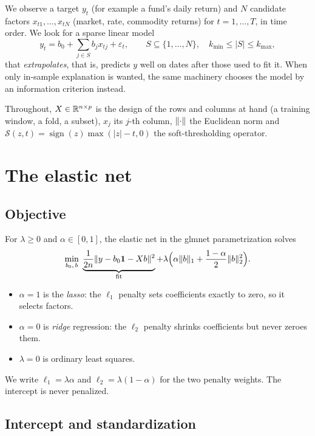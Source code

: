 \documentclass[11pt,a4paper]{article}
\newcommand{\sth}{\mathcal{S}}
\begin{document}
We observe a target $y_t$ (for example a fund's daily return) and $N$ candidate factors
$x_{t1},\dots,x_{tN}$ (market, rate, commodity returns) for $t=1,\dots,T$, in time order.
We look for a sparse linear model
\[
  y_t = b_0 + \sum_{j\in S} b_j x_{tj} + \varepsilon_t,\qquad S\subseteq\{1,\dots,N\},\quad
  k_{\min}\le|S|\le k_{\max},
\]
that \emph{extrapolates}, that is, predicts $y$ well on dates after those used to fit it.
When only in-sample explanation is wanted, the same machinery chooses the model by an
information criterion instead.

Throughout, $X\in\mathbb{R}^{n\times p}$ is the design of the rows and columns at hand (a training
window, a fold, a subset), $x_j$ its $j$-th column, $\lVert \cdot\rVert$ the Euclidean norm and
$\sth(z,t)=\operatorname{sign}(z)\max(|z|-t,0)$ the soft-thresholding operator.

\section{The elastic net}

\subsection{Objective}
For $\lambda\ge0$ and $\alpha\in[0,1]$, the elastic net in the glmnet parametrization
solves
\begin{equation}\label{eq:enet}
  \min_{b_0,\,b}\;
  \underbrace{\frac{1}{2n}\lVert y-b_0\mathbf 1-Xb\rVert^2}_{\text{fit}}
  +\lambda\Big(\alpha\lVert b\rVert_1+\frac{1-\alpha}{2}\lVert b\rVert_2^2\Big).
\end{equation}
\begin{itemize}
  \item $\alpha=1$ is the \emph{lasso}: the $\ell_1$ penalty sets coefficients exactly to
        zero, so it selects factors.
  \item $\alpha=0$ is \emph{ridge} regression: the $\ell_2$ penalty shrinks coefficients
        but never zeroes them.
  \item $\lambda=0$ is ordinary least squares.
\end{itemize}
We write $\ell_1=\lambda\alpha$ and $\ell_2=\lambda(1-\alpha)$ for the two penalty weights.
The intercept is never penalized.

\subsection{Intercept and standardization}\label{sec:standardize}
\end{document}
